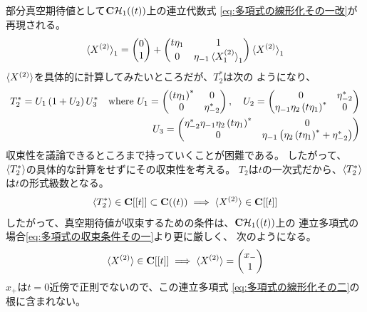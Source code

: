 {	部分真空期待値として$\mathbf{C}{{\mathcal{H}}}_1((t))$上の連立代数式
	\eqref{eq:多項式の線形化その一改}が再現される。
	\begin{equation*}\begin{split}
		\mathinner{\langle{X^{(2)}}\rangle}_1 = \begin{pmatrix}{0}\\{1}\end{pmatrix} + \begin{pmatrix}
			t\eta_1 & 1 \\ 0 & \eta_{-1}\mathinner{\langle{X^{(2)}_1}\rangle}_1
		\end{pmatrix} \mathinner{\langle{X^{(2)}}\rangle}_1
	\end{split}\end{equation*}
	$\mathinner{\langle{X^{(2)}}\rangle}$を具体的に計算してみたいところだが、$T_2^*$は次の
	ようになり、
	\begin{equation*}\begin{split}
		T_2^* = U_1\mathinner{\left({1 + U_2}\right)}U_3^* \quad\text{where }
		U_1 = \begin{pmatrix}
			\mathinner{\left({t\eta_1}\right)}^* & 0 \\ 0 & \eta_{-2}^*
		\end{pmatrix},\quad U_2 = \begin{pmatrix}
			0 & \eta_{-2}^* \\ \eta_{-1}\eta_2\mathinner{\left({t\eta_1}\right)}^* & 0
		\end{pmatrix} \\
		U_3 = \begin{pmatrix}
			\eta_{-2}^*\eta_{-1}\eta_2\mathinner{\left({t\eta_1}\right)}^* & 0 \\
			0 & \eta_{-1}\mathinner{\left({\eta_2\mathinner{\left({t\eta_1}\right)}^* + \eta_{-2}^*}\right)} \\
		\end{pmatrix}
	\end{split}\end{equation*}
	収束性を議論できるところまで持っていくことが困難である。
	したがって、$\mathinner{\langle{T_2^*}\rangle}$の具体的な計算をせずにその収束性を考える。
	$T_2$は$t$の一次式だから、$\mathinner{\langle{T_2^*}\rangle}$は$t$の形式級数となる。
	\begin{equation*}\begin{split}
		\mathinner{\langle{T_2^*}\rangle}\in\mathbf{C}[[t]]\subset\mathbf{C}((t))
		\implies \mathinner{\langle{X^{(2)}}\rangle}\in\mathbf{C}[[t]]
	\end{split}\end{equation*}
	したがって、真空期待値が収束するための条件は、$\mathbf{C}{{\mathcal{H}}}_1((t))$上の
	連立多項式の場合\eqref{eq:多項式の収束条件その一}より更に厳しく、
	次のようになる。
	\begin{equation*}\begin{split}
		\mathinner{\langle{X^{(2)}}\rangle}\in\mathbf{C}[[t]]
		\implies \mathinner{\langle{X^{(2)}}\rangle} = \begin{pmatrix}{x_-}\\{1}\end{pmatrix}
	\end{split}\end{equation*}
	$x_+$は$t=0$近傍で正則でないので、この連立多項式
	\eqref{eq:多項式の線形化その二}の根に含まれない。

}
